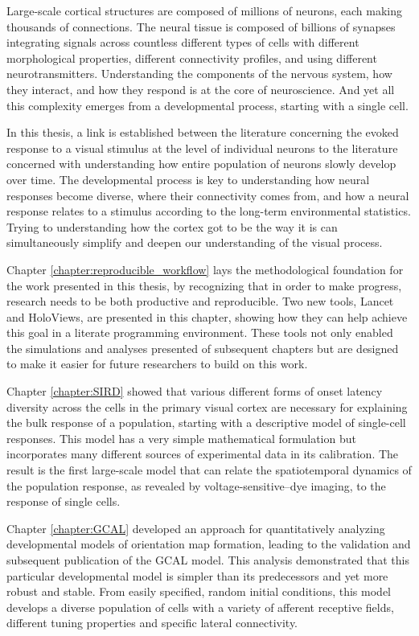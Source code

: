 \documentclass[phd,ianc,twoside]{infthesis}
\begin{document}
Large-scale cortical structures are composed of millions of neurons,
each making thousands of connections. The neural tissue is composed of
billions of synapses integrating signals across countless different
types of cells with different morphological properties, different
connectivity profiles, and using different
neurotransmitters. Understanding the components of the nervous system,
how they interact, and how they respond is at the core of
neuroscience. And yet all this complexity emerges from a developmental
process, starting with a single cell.

In this thesis, a link is established between the literature concerning
the evoked response to a visual stimulus at the level of individual
neurons to the literature concerned with understanding how entire
population of neurons slowly develop over time. The developmental
process is key to understanding how neural responses become diverse,
where their connectivity comes from, and how a neural response relates
to a stimulus according to the long-term environmental
statistics. Trying to understanding how the cortex got to be the way it
is can simultaneously simplify and deepen our understanding of the
visual process.

Chapter \ref{chapter:reproducible_workflow} lays the methodological
foundation for the work presented in this thesis, by recognizing that in order to make
progress, research needs to be both productive and reproducible. Two new
tools, Lancet and HoloViews, are presented in this chapter, showing how
they can help achieve this goal in a literate programming
environment. These tools not only enabled the simulations and analyses
presented of subsequent chapters but are designed to make it easier for
future researchers to build on this work.

Chapter \ref{chapter:SIRD} showed that various different forms of onset
latency diversity across the cells in the primary visual cortex are
necessary for explaining the bulk response of a population, starting
with a descriptive model of single-cell responses. This model has a very
simple mathematical formulation but incorporates many different sources
of experimental data in its calibration. The result is the first
large-scale model that can relate the spatiotemporal dynamics of the
population response, as revealed by voltage-sensitive--dye imaging, to
the response of single cells.

Chapter \ref{chapter:GCAL} developed an approach for quantitatively
analyzing developmental models of orientation map formation, leading to
the validation and subsequent publication of the GCAL model. This
analysis demonstrated that this particular developmental model is
simpler than its predecessors and yet more robust and stable. From
easily specified, random initial conditions, this model develops a
diverse population of cells with a variety of afferent receptive fields,
different tuning properties and specific lateral connectivity.
\end{document}
